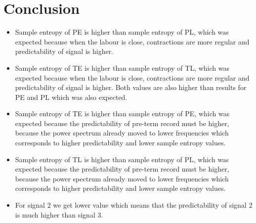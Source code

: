 \documentclass[a4paper,10pt]{article}
\begin{document}
\section {Conclusion}
\begin{itemize}
\item{Sample entropy of PE is higher than sample entropy of PL, which was expected because when the labour is close, contractions are more regular and predictability of signal is higher. }
\item{Sample entropy of TE is higher than sample entropy of TL, which was expected because when the labour is close, contractions are more regular and predictability of signal is higher. Both values are also higher than results for PE and PL which was also expected.}
\item{Sample entropy of TE is higher than sample entropy of PE, which was expected because the predictability of pre-term record must be higher, because the power spectrum already moved to lower frequencies which corresponds to higher predictability and lower sample entropy values.}
\item{Sample entropy of TL is higher than sample entropy of PL, which was expected because the predictability of pre-term record must be higher, because the power spectrum already moved to lower frequencies which corresponds to higher predictability and lower sample entropy values.}
\item{For signal 2 we get lower value which means that the predictability of signal 2 is much higher than signal 3.}
\end{itemize}
\end{document}
